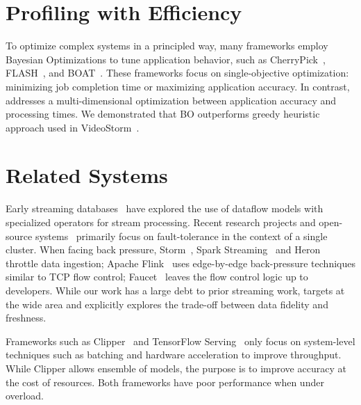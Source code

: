 \documentclass[thesis.tex]{subfiles}
\begin{document}
\section{Profiling with Efficiency}
\label{sec:prof-with-effic}

 To optimize complex systems in a principled way,
many frameworks employ Bayesian Optimizations to tune application behavior, such
as CherryPick~\cite{alipourfard2017cherrypick}, FLASH~\cite{zhang2016flash}, and
BOAT~\cite{dalibard2017boat}. These frameworks focus on single-objective
optimization: minimizing job completion time or maximizing application
accuracy. In contrast, \sysname{} addresses a multi-dimensional optimization
between application accuracy and processing times. We demonstrated that BO
outperforms greedy heuristic approach used in VideoStorm~\cite{zhang2017live}.

\section{Related Systems}
\label{sec:related-systems}

 Early streaming
databases~\cite{abadi2005design, chandrasekaran2003telegraphcq} have explored
the use of dataflow models with specialized operators for stream
processing. Recent research projects and open-source
systems~\cite{akidau2013millwheel, toshniwal2014storm, sanjeev2015twitter,
  zaharia2013discretized, carbone2015apache} primarily focus on fault-tolerance
in the context of a single cluster. When facing back pressure,
Storm~\cite{toshniwal2014storm}, Spark Streaming~\cite{zaharia2013discretized}
and Heron~\cite{sanjeev2015twitter} throttle data ingestion; Apache
Flink~\cite{carbone2015apache} uses edge-by-edge back-pressure techniques
similar to TCP flow control; Faucet~\cite{lattuada2016faucet} leaves the flow
control logic up to developers.  While our work has a large debt to prior
streaming work, \sysname{} targets at the wide area and explicitly explores the
trade-off between data fidelity and freshness.

 Frameworks such as Clipper~\cite{crankshaw2017clipper} and
TensorFlow Serving~\cite{tensorflow2017serving} only focus on system-level
techniques such as batching and hardware acceleration to improve
throughput. While Clipper allows ensemble of models, the purpose is to improve
accuracy at the cost of resources. Both frameworks have poor performance when
under overload.
\end{document}

